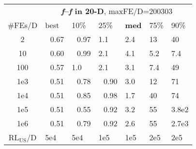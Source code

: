 \begin{tabular}{c|llllll}
 & \multicolumn{6}{|c}{\textbf{\textit{f}\raisebox{-0.35ex}{1}--\textit{f}\raisebox{-0.35ex}{24} in 20-D}, maxFE/D=200303}\\
\#FEs/D & best & 10\% & 25\% & \textbf{med} & 75\% & 90\%\\
2 & ~\,0.67 & ~\,0.97 & \hspace*{1ex}1.1 & \hspace*{1ex}2.4 & 13 & 40\\
10 & ~\,0.60 & ~\,0.99 & \hspace*{1ex}2.1 & \hspace*{1ex}4.1 & \hspace*{1ex}5.2 & \hspace*{1ex}7.4\\
100 & ~\,0.57 & \hspace*{1ex}1.0 & \hspace*{1ex}2.1 & \hspace*{1ex}3.1 & \hspace*{1ex}7.4 & 49\\
1e3 & ~\,0.51 & ~\,0.78 & ~\,0.90 & \hspace*{1ex}3.0 & 12 & 71\\
1e4 & ~\,0.51 & ~\,0.85 & ~\,0.98 & \hspace*{1ex}1.7 & 40 & 74\\
1e5 & ~\,0.51 & ~\,0.55 & ~\,0.92 & \hspace*{1ex}3.2 & 55 & 3.8e2\\
1e6 & ~\,0.51 & ~\,0.79 & ~\,0.92 & \hspace*{1ex}2.6 & 55 & 2.7e3\\
$\text{RL}_{\text{US}}$/D & 5e4 & 5e4 & 1e5 & 1e5 & 2e5 & 2e5
\end{tabular}
